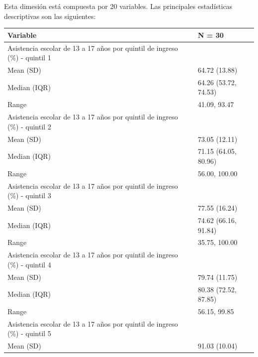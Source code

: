 Esta dimesión está compuesta por 20 variables. Las principales
estadísticas descriptivas son las siguientes:

\begin{table}
\centering\begingroup\fontsize{7}{9}\selectfont

\begin{tabular}{ll}
\toprule
Variable & N = 30\\
\midrule
Asistencia escolar de 13 a 17 años por quintil de ingreso (\%) - quintil 1 & \\
\hspace{1em}Mean (SD) & 64.72 (13.88)\\
\hspace{1em}Median (IQR) & 64.26 (53.72, 74.53)\\
\hspace{1em}Range & 41.09, 93.47\\
Asistencia escolar de 13 a 17 años por quintil de ingreso (\%) - quintil 2 & \\
\addlinespace
\hspace{1em}Mean (SD) & 73.05 (12.11)\\
\hspace{1em}Median (IQR) & 71.15 (64.05, 80.96)\\
\hspace{1em}Range & 56.00, 100.00\\
Asistencia escolar de 13 a 17 años por quintil de ingreso (\%) - quintil 3 & \\
\hspace{1em}Mean (SD) & 77.55 (16.24)\\
\addlinespace
\hspace{1em}Median (IQR) & 74.62 (66.16, 91.84)\\
\hspace{1em}Range & 35.75, 100.00\\
Asistencia escolar de 13 a 17 años por quintil de ingreso (\%) - quintil 4 & \\
\hspace{1em}Mean (SD) & 79.74 (11.75)\\
\hspace{1em}Median (IQR) & 80.38 (72.52, 87.85)\\
\addlinespace
\hspace{1em}Range & 56.15, 99.85\\
Asistencia escolar de 13 a 17 años por quintil de ingreso (\%) - quintil 5 & \\
\hspace{1em}Mean (SD) & 91.03 (10.04)\\

\end{tabular}
\end{table}
